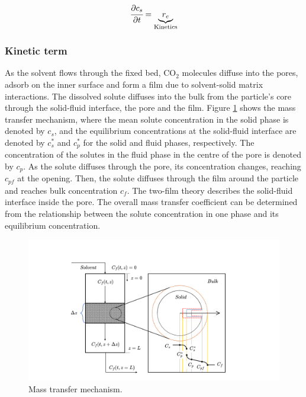 \documentclass[a4paper,fleqn]{cas-dc}
\begin{document}
	{\footnotesize
		\begin{equation} 
			\label{Model_solid}
			\cfrac{\partial c_s}{\partial t} = \underbrace{ r_e }_{\text{Kinetics}}
	\end{equation} }
	
	\subsubsection{Kinetic term} \label{CH: Kinetic}
	
	As the solvent flows through the fixed bed, CO$_2$ molecules diffuse into the pores, adsorb on the inner surface and form a film due to solvent-solid matrix interactions. The dissolved solute diffuses into the bulk from the particle's core through the solid-fluid interface, the pore and the film. Figure \ref{fig: SFE_Mechanism} shows the mass transfer mechanism, where the mean solute concentration in the solid phase is denoted by $c_s$, and the equilibrium concentrations at the solid-fluid interface are denoted by $c_s^*$ and $c_p^*$ for the solid and fluid phases, respectively. The concentration of the solutes in the fluid phase in the centre of the pore is denoted by $c_p$. As the solute diffuses through the pore, its concentration changes, reaching $c_{pf}$ at the opening. Then, the solute diffuses through the film around the particle and reaches bulk concentration $c_f$. The two-film theory describes the solid-fluid interface inside the pore. The overall mass transfer coefficient can be determined from the relationship between the solute concentration in one phase and its equilibrium concentration.
	
	\begin{figure}[h!]
		\centering
		\includegraphics[trim = 45cm 0cm 60cm 20cm,clip,width=0.85\columnwidth]{Figures/SFE_PFD.drawio.png}	
		\caption{Mass transfer mechanism.}
		\label{fig: SFE_Mechanism}
	\end{figure}
	
\end{document}
